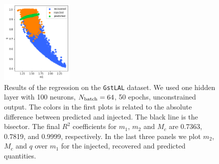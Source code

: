 \documentclass[prd,aps,twocolumn,a4paper,showkeys,nofootinbib]{article}
\begin{document}
\begin{figure}[]
  \includegraphics[width=0.31\textwidth]{./Figs/GstLAL_q.png}
  \caption{\label{fig:GstLAL_results} Results of the regression on the \texttt{GstLAL}
  dataset. We used one hidden layer with 100 neurons, $N_{\rm batch}=64$, 50 epochs,  
  unconstrained output.
  The colors in the first plots is related to the absolute difference between predicted 
  and injected. The black line is the bisector.
  The final $R^2$ coefficients for $m_1$, $m_2$ and $M_c$ 
  are 0.7363, 0.7819, and 0.9999, respectively.
  In the last three panels we plot $m_2$, $M_c$ and $q$ over $m_1$ for the injected, recovered
  and predicted quantities.}
\end{figure}

\end{document}

